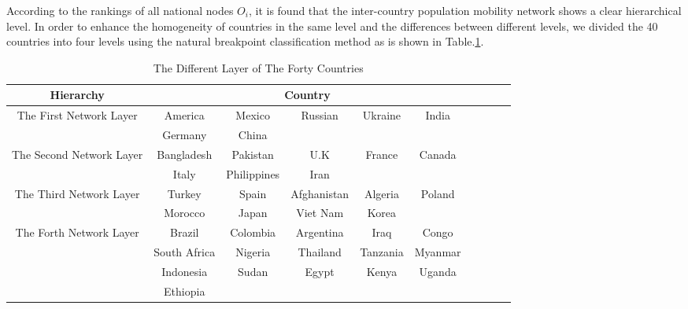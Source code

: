 According to the rankings of all national nodes ${O_i}$, it is found that the inter-country population mobility network shows a clear hierarchical level. In order to enhance the homogeneity of countries in the same level and the differences between different levels, we divided the 40 countries into four levels using the natural breakpoint classification method as is shown in Table.\ref{ceng}.
\begin{table}[H]
\centering
\caption{The Different Layer of The Forty Countries}
\label{ceng}
\begin{tabular}{ccccccclll}
                        \toprule
Hierarchy                & \multicolumn{5}{c}{Country}                                   \\
\midrule
The First Network Layer  & America      & Mexico      & Russian     & Ukraine  & India     \\
                         & Germany      & China       &             &          &          \\
                       \midrule
The Second Network Layer & Bangladesh   & Pakistan    & U.K         & France   & Canada    \\
                         & Italy        & Philippines & Iran        &          &           \\
                         \midrule
The Third Network Layer  & Turkey       & Spain       & Afghanistan & Algeria  & Poland   \\
                         & Morocco      & Japan       & Viet Nam    & Korea    &           \\
                         \midrule
The Forth Network Layer  & Brazil       & Colombia    & Argentina   & Iraq     & Congo   \\
                         & South Africa & Nigeria     & Thailand    & Tanzania & Myanmar   \\
                         & Indonesia    & Sudan       & Egypt       & Kenya    & Uganda   \\
                         & Ethiopia     &             &             &          &          \\
\bottomrule
\end{tabular}
\end{table}

